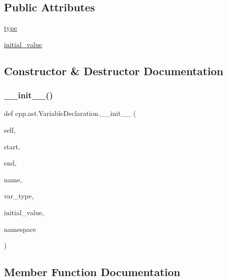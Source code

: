 \subsection*{Public Attributes}
\begin{DoxyCompactItemize}
\item 
\mbox{\hyperlink{classcpp_1_1ast_1_1_variable_declaration_a8c7cc8578ea12f93c6e1c5c6ef4ddf99}{type}}
\item 
\mbox{\hyperlink{classcpp_1_1ast_1_1_variable_declaration_a7c259ca42a06e264679e8ab66e7ea374}{initial\+\_\+value}}
\end{DoxyCompactItemize}


\subsection{Constructor \& Destructor Documentation}
\mbox{\label{classcpp_1_1ast_1_1_variable_declaration_adc19909b6a3b2c2978b02044634fc13f}} 
\subsubsection{\texorpdfstring{\_\_init\_\_()}{\_\_init\_\_()}}
{\footnotesize\ttfamily def cpp.\+ast.\+Variable\+Declaration.\+\_\+\+\_\+init\+\_\+\+\_\+ (\begin{DoxyParamCaption}\item[{}]{self,  }\item[{}]{start,  }\item[{}]{end,  }\item[{}]{name,  }\item[{}]{var\+\_\+type,  }\item[{}]{initial\+\_\+value,  }\item[{}]{namespace }\end{DoxyParamCaption})}



\subsection{Member Function Documentation}
\mbox{\label{classcpp_1_1ast_1_1_variable_declaration_a9f5c15731d1bdd8fe14c2a575e2f4fe6}} 
